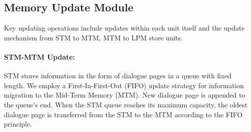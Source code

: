 \documentclass[11pt]{article}
\begin{document}
\subsection{Memory Update Module}
Key updating operations include updates within each unit itself and the update mechanism from STM to MTM, MTM to LPM store units.


\paragraph{STM-MTM Update:} 
STM stores information in the form of dialogue pages in a queue with fixed length. We employ a First-In-First-Out (FIFO) update strategy for information migration to the Mid-Term Memory (MTM). 
New dialogue page is appended to the queue's end. When the STM queue reaches its maximum capacity, the oldest dialogue page is transferred from the STM to the MTM according to the FIFO principle.



\end{document}
